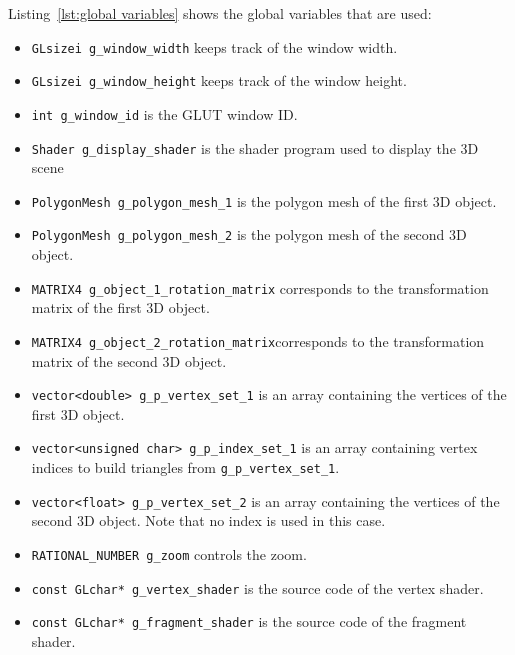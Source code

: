 \documentclass[11pt,oneside,a4paper,final]{article}
\begin{document}
Listing~\ref{lst:global variables} shows the global variables that are used:
\begin{itemize}
	\item \verb+GLsizei g_window_width+ keeps track of the window width.

	\item \verb+GLsizei g_window_height+ keeps track of the window height.
	
	\item \verb+int g_window_id+ is the GLUT window ID.
	
	\item \verb+Shader g_display_shader+ is the shader program used to 
		display the 3D scene
	
	\item \verb+PolygonMesh g_polygon_mesh_1+ is the polygon mesh of the first 
		3D object.
	
	\item \verb+PolygonMesh g_polygon_mesh_2+ is the polygon mesh of the second 
		3D object.

	\item \verb+MATRIX4 g_object_1_rotation_matrix+ corresponds to the 
		transformation matrix of the first 3D object.
	
	\item \verb+MATRIX4 g_object_2_rotation_matrix+corresponds to the 
		transformation matrix of the second 3D object.

	\item \verb+vector<double> g_p_vertex_set_1+ is an array containing 
		the vertices of the first 3D object.
		
	\item \verb+vector<unsigned char> g_p_index_set_1+ is an array 
		containing vertex indices to build triangles from 
		\verb+g_p_vertex_set_1+.

	\item \verb+vector<float> g_p_vertex_set_2+ is an array containing 
		the vertices of the second 3D object. Note that no index is used in 
		this case.

	\item \verb+RATIONAL_NUMBER g_zoom+ controls the zoom.

	\item \verb+const GLchar* g_vertex_shader+ is the source code of the vertex 
		shader.

	\item \verb+const GLchar* g_fragment_shader+ is the source code of the 
		fragment shader.
\end{itemize}
\end{document}
